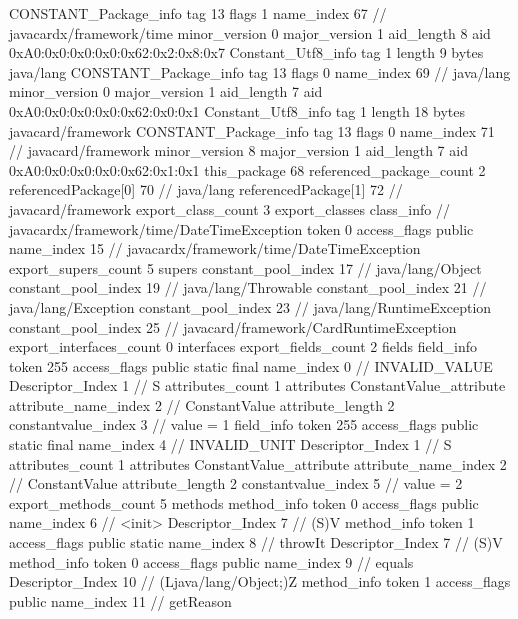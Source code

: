 {{{		}
		CONSTANT_Package_info {
			tag	13
			flags	1
			name_index	67		// javacardx/framework/time
			minor_version	0
			major_version	1
			aid_length	8
			aid	0xA0:0x0:0x0:0x0:0x62:0x2:0x8:0x7
		}
		Constant_Utf8_info {
			tag	1
			length	9
			bytes	java/lang
		}
		CONSTANT_Package_info {
			tag	13
			flags	0
			name_index	69		// java/lang
			minor_version	0
			major_version	1
			aid_length	7
			aid	0xA0:0x0:0x0:0x0:0x62:0x0:0x1
		}
		Constant_Utf8_info {
			tag	1
			length	18
			bytes	javacard/framework
		}
		CONSTANT_Package_info {
			tag	13
			flags	0
			name_index	71		// javacard/framework
			minor_version	8
			major_version	1
			aid_length	7
			aid	0xA0:0x0:0x0:0x0:0x62:0x1:0x1
		}
	}
	this_package	68
	referenced_package_count	2
	referencedPackage[0]	70		// java/lang
	referencedPackage[1]	72		// javacard/framework
	export_class_count	3
	export_classes {
		class_info {		// javacardx/framework/time/DateTimeException
			token	0
			access_flags	public
			name_index	15		// javacardx/framework/time/DateTimeException
			export_supers_count	5
			supers {
				constant_pool_index	17		// java/lang/Object
				constant_pool_index	19		// java/lang/Throwable
				constant_pool_index	21		// java/lang/Exception
				constant_pool_index	23		// java/lang/RuntimeException
				constant_pool_index	25		// javacard/framework/CardRuntimeException
			}
			export_interfaces_count	0
			interfaces {
			}
			export_fields_count	2
			fields {
			field_info {
				token	255
				access_flags	public static final
				name_index	0		// INVALID_VALUE
				Descriptor_Index	1		// S
				attributes_count	1
				attributes {
				ConstantValue_attribute {
					attribute_name_index	2		// ConstantValue
					attribute_length	2
					constantvalue_index	3		// value = 1
				}
				}
			}
			field_info {
				token	255
				access_flags	public static final
				name_index	4		// INVALID_UNIT
				Descriptor_Index	1		// S
				attributes_count	1
				attributes {
				ConstantValue_attribute {
					attribute_name_index	2		// ConstantValue
					attribute_length	2
					constantvalue_index	5		// value = 2
				}
				}
			}
			}
			export_methods_count	5
			methods {
				method_info {
					token	0
					access_flags	public
					name_index	6		// <init>
					Descriptor_Index	7		// (S)V
				}
				method_info {
					token	1
					access_flags	public static
					name_index	8		// throwIt
					Descriptor_Index	7		// (S)V
				}
				method_info {
					token	0
					access_flags	public
					name_index	9		// equals
					Descriptor_Index	10		// (Ljava/lang/Object;)Z
				}
				method_info {
					token	1
					access_flags	public
					name_index	11		// getReason
}}}}}
